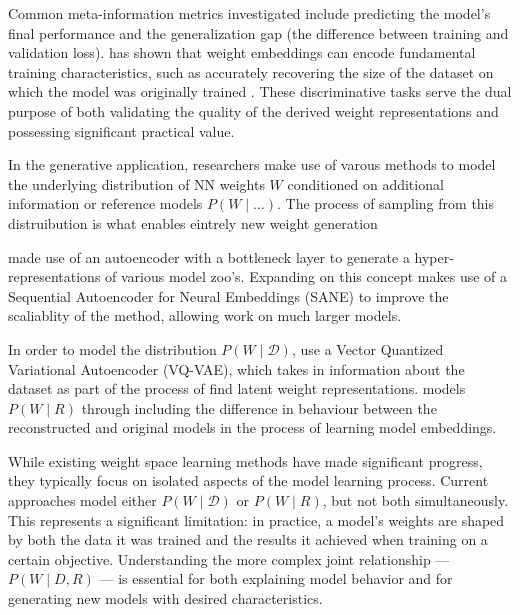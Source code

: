 Common meta-information metrics investigated include predicting the model's final performance and the generalization gap (the difference between training and validation loss).\cite{salama2024datasetsizerecoverylora} has shown that weight embeddings can encode fundamental training characteristics, such as accurately recovering the size of the dataset on which the model was originally trained . These discriminative tasks serve the dual purpose of both validating the quality of the derived weight representations and possessing significant practical value.

In the generative application, researchers make use of varous methods to model the underlying distribution of NN weights $W$ conditioned on additional information or reference models $P(W\mid \dots)$. The process of sampling from this distruibution is what enables eintrely new weight generation

\cite{schurholt2022hyperrepresentationsgenerativemodelssampling} made use of an autoencoder with a bottleneck layer to generate a hyper-representations of various model zoo's. Expanding on this concept \cite{pmlr-v235-schurholt24a} makes use of a Sequential Autoencoder for Neural Embeddings (SANE) to improve the scaliablity of the method, allowing work on much larger models.

In order to model the distribution $P(W\mid \mathcal{D})$, \cite{bedionita2025instructionguidedautoregressiveneuralnetwork} use a Vector Quantized Variational Autoencoder (VQ-VAE), which takes in information about the dataset as part of the process of find latent weight representations.\cite{meynent2025structureenoughleveragingbehavior} models $P(W\mid R)$ through including the difference in behaviour between the reconstructed and original models in the process of learning model embeddings. 

While existing weight space learning methods have made significant progress, they typically focus on isolated aspects of the model learning process. Current approaches model either $P(W\mid \mathcal{D})$ or $P(W\mid R)$, but not both simultaneously. This represents a significant limitation: in practice, a model's weights are shaped by both the data it was trained and the results it achieved when training on a certain objective. Understanding the more complex joint relationship ---$P(W \mid D,R)$ --- is essential for both explaining model behavior and for generating new models with desired characteristics.

